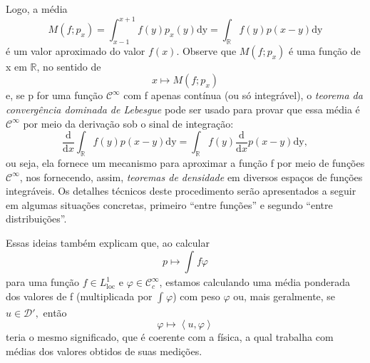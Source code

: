 \documentclass[../distribution_theory_notes.tex]{subfiles}
\begin{document}
            Logo, a média 
              \[
                M(f; p_{x})= \int_{x-1}^{x+1}f(y)p_{x}(y) \mathrm{dy}=\int_{\mathbb{R}}^{}f(y)p(x-y) \mathrm{dy}
              \]
              é um valor aproximado do valor \(f(x).\) Observe que \(M(f; p_x)\) é uma função de x em \(\mathbb{R}\), no sentido de 
                \[
                  x\mapsto M(f; p_x)
                \]
                e, se p for uma função \(\mathcal{C}^{\infty}\) com f apenas contínua (ou só integrável), o \textit{teorema da convergência dominada de Lebesgue} pode ser usado para provar que essa média é \(\mathcal{C}^{\infty}\) por meio da derivação sob o sinal de integração: 
                  \[
                    \frac{\mathrm{d}}{\mathrm{d}x} \int_{\mathbb{R}}^{}f(y)p(x-y) \mathrm{dy}=\int_{\mathbb{R}}^{}f(y) \frac{\mathrm{d}}{\mathrm{d}x}p(x-y) \mathrm{dy},
                  \]
                  ou seja, ela fornece um mecanismo para aproximar a função f por meio de funções \(\mathcal{C}^{\infty}\), nos fornecendo, assim, \textit{teoremas de densidade} em diversos espaços de funções integráveis. Os detalhes técnicos deste procedimento serão apresentados a seguir em algumas situações concretas, primeiro ``entre funções'' e segundo ``entre distribuições''.

                  Essas ideias também explicam que, ao calcular 
                    \[
                      p\mapsto \int_{}^{}f \varphi
                    \]
                    para uma função \(f\in L_{\mathrm{loc}}^{1}\) e \(\varphi \in \mathcal{C}_{c}^{\infty}\), estamos calculando uma média ponderada dos valores de f (multiplicada por \(\int_{}^{}\varphi \)) com peso \(\varphi \) ou, mais geralmente, se \(u\in \mathcal{D}',\) então 
                      \[
                        \varphi \mapsto \left< u, \varphi  \right>
                      \]
                      teria o mesmo significado, que é coerente com a física, a qual trabalha com médias dos valores obtidos de suas medições.
\end{document}
